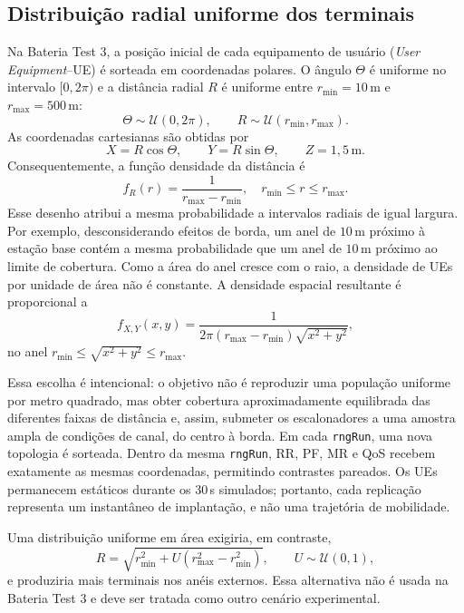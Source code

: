 \subsection{Distribuição radial uniforme dos terminais}
\label{subsec:distribuicao-radial-uniforme}

Na Bateria Test 3, a posição inicial de cada equipamento de usuário
(\textit{User Equipment}--UE) é sorteada em coordenadas polares. O ângulo
$\Theta$ é uniforme no intervalo $[0,2\pi)$ e a distância radial $R$ é uniforme
entre $r_{\min}=10\,\mathrm{m}$ e $r_{\max}=500\,\mathrm{m}$:
\begin{equation}
  \Theta \sim \mathcal{U}(0,2\pi),
  \qquad
  R \sim \mathcal{U}(r_{\min},r_{\max}).
\end{equation}
As coordenadas cartesianas são obtidas por
\begin{equation}
  X=R\cos\Theta,
  \qquad
  Y=R\sin\Theta,
  \qquad
  Z=1{,}5\,\mathrm{m}.
\end{equation}
Consequentemente, a função densidade da distância é
\begin{equation}
  f_R(r)=\frac{1}{r_{\max}-r_{\min}},
  \quad r_{\min}\leq r\leq r_{\max}.
\end{equation}
Esse desenho atribui a mesma probabilidade a intervalos radiais de igual
largura. Por exemplo, desconsiderando efeitos de borda, um anel de $10\,$m
próximo à estação base contém a mesma probabilidade que um anel de $10\,$m
próximo ao limite de cobertura. Como a área do anel cresce com o raio, a
densidade de UEs por unidade de área não é constante. A densidade espacial
resultante é proporcional a
\begin{equation}
  f_{X,Y}(x,y)=
  \frac{1}{2\pi(r_{\max}-r_{\min})\sqrt{x^2+y^2}},
\end{equation}
no anel $r_{\min}\leq\sqrt{x^2+y^2}\leq r_{\max}$.

Essa escolha é intencional: o objetivo não é reproduzir uma população
uniforme por metro quadrado, mas obter cobertura aproximadamente equilibrada
das diferentes faixas de distância e, assim, submeter os escalonadores a uma
amostra ampla de condições de canal, do centro à borda. Em cada
\texttt{rngRun}, uma nova topologia é sorteada. Dentro da mesma
\texttt{rngRun}, RR, PF, MR e QoS recebem exatamente as mesmas coordenadas,
permitindo contrastes pareados. Os UEs permanecem estáticos durante os
$30\,$s simulados; portanto, cada replicação representa um instantâneo de
implantação, e não uma trajetória de mobilidade.

Uma distribuição uniforme em área exigiria, em contraste,
\begin{equation}
 R=\sqrt{r_{\min}^{2}+U(r_{\max}^{2}-r_{\min}^{2})},
 \qquad U\sim\mathcal{U}(0,1),
\end{equation}
e produziria mais terminais nos anéis externos. Essa alternativa não é usada
na Bateria Test 3 e deve ser tratada como outro cenário experimental.
